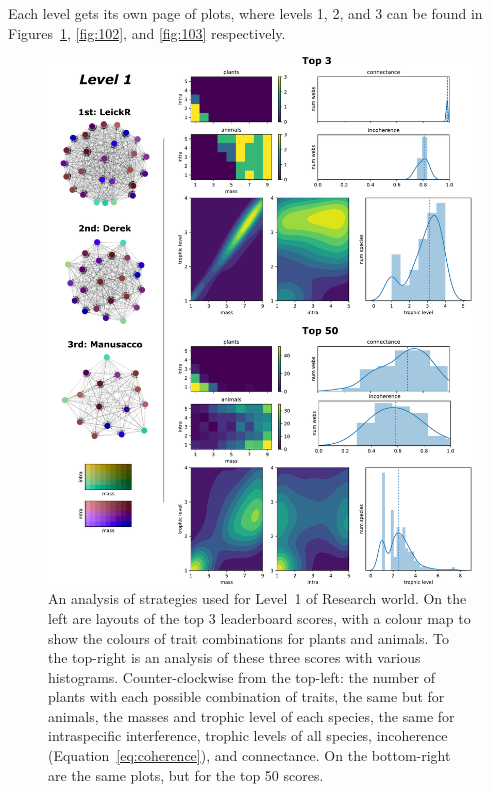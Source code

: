 Each level gets its own page of plots, where levels 1, 2, and 3 can be found in Figures~\ref{fig:101}, \ref{fig:102}, and \ref{fig:103} respectively.
\begin{figure}
  \centering
  \includegraphics[height=.85\textheight, right]{joy/101.pdf}
  \caption[Results from Research World Level~1]{An analysis of strategies used for Level~1 of Research world. On the left are layouts of the top 3 leaderboard scores, with a colour map to show the colours of trait combinations for plants and animals.
  To the top-right is an analysis of these three scores with various histograms. Counter-clockwise from the top-left: the number of plants with each possible combination of traits, the same but for animals, the masses and trophic level of each species, the same for intraspecific interference, trophic levels of all species, incoherence (Equation~\eqref{eq:coherence}), and connectance. On the bottom-right are the same plots, but for the top 50 scores.}
  \label{fig:101}
\end{figure}

